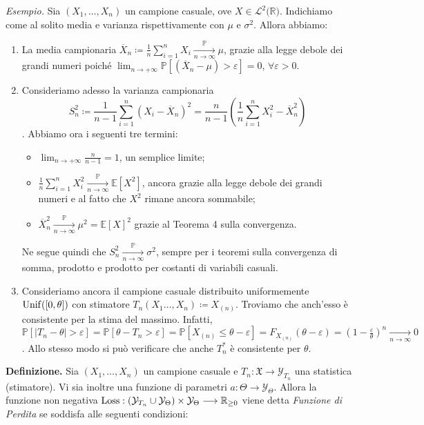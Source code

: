 \noindent\textit{Esempio.} Sia $(X_1,\ldots,X_n)$ un campione casuale, ove $X\in \mathcal{L}^2(\mathbb{R)}$. Indichiamo come al solito media e varianza rispettivamente con $\mu$ e $\sigma^2$. Allora abbiamo:
\begin{enumerate}
\item La media campionaria $\overline{X}_n\coloneqq \frac{1}{n}\sum_{i=1}^n X_i\xrightarrow[n\rightarrow \infty]{\mathbb{P}} \mu$, grazie alla legge debole dei grandi numeri poiché $\lim_{n\rightarrow +\infty} \mathbb{P}[(\overline{X}_n-\mu)>\varepsilon ]=0$, $\forall \varepsilon >0$.
\item Consideriamo adesso la varianza campionaria $$S_n^2\coloneqq \frac{1}{n-1}\sum_{i=1}^n (X_i-\overline{X}_n)^2=\frac{n}{n-1}\left(\frac{1}{n}\sum_{i=1}^n X_i^2-\overline{X}_n^2\right)$$. Abbiamo ora i seguenti tre termini:
\begin{itemize}
\item $\lim_{n\rightarrow +\infty} \frac{n}{n-1}=1$, un semplice limite;
\item $\frac{1}{n}\sum_{i=1}^n X_i^2 \xrightarrow[n\rightarrow \infty]{\mathbb{P}} \mathbb{E}[X^2]$, ancora grazie alla legge debole dei grandi numeri e al fatto che $X^2$ rimane ancora sommabile;
\item $\overline{X}_n^2 \xrightarrow[n\rightarrow \infty]{\mathbb{P}} \mu^2=\mathbb{E}[X]^2$ grazie al Teorema 4 sulla convergenza.
\end{itemize}
Ne segue quindi che $S_n^2 \xrightarrow[n\rightarrow \infty]{\mathbb{P}} \sigma^2$, sempre per i teoremi sulla convergenza di somma, prodotto e prodotto per costanti di variabili casuali.
\item Consideriamo ancora il campione casuale distribuito uniformemente $\operatorname{Unif}([0,\theta])$ con stimatore $T_n(X_1\ldots,X_n)\coloneqq X_{(n)}$. Troviamo che anch'esso è consistente per la stima del massimo. Infatti, $\mathbb{P}[|T_n-\theta|>\varepsilon]=\mathbb{P}[\theta-T_n>\varepsilon]=\mathbb{P}[X_{(n)}\leq \theta-\varepsilon]=F_{X_{(n)}}(\theta -\varepsilon)=\left(1-\frac{\varepsilon}{\theta}\right)^n \xrightarrow[n\rightarrow \infty]{} 0$. Allo stesso modo si può verificare che anche $T_n^*$ è consistente per $\theta$.
\end{enumerate}
\textbf{Definizione.} Sia $(X_1,\ldots,X_n)$ un campione casuale e $T_n: \mathfrak{X}\longrightarrow\mathcal{Y}_{T_n}$ una statistica (stimatore). Vi sia inoltre una funzione di parametri $a: \Theta\longrightarrow\mathcal{Y}_{\Theta}$. Allora la funzione non negativa $\operatorname{Loss}: \left(\mathcal{Y}_{T_n}\cup\mathcal{Y}_{\Theta}\right)\times\mathcal{Y}_{\Theta}\longrightarrow \mathbb{R}_{\geq 0}$ viene detta \textit{Funzione di Perdita} se soddisfa alle seguenti condizioni:
